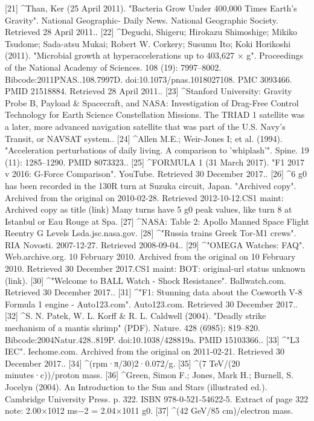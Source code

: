 [21]
^Than, Ker (25 April 2011). "Bacteria Grow Under 400,000 Times Earth's Gravity". National Geographic- Daily News. National Geographic Society. Retrieved 28 April 2011..
[22]
^Deguchi, Shigeru; Hirokazu Shimoshige; Mikiko Tsudome; Sada-atsu Mukai; Robert W. Corkery; Susumu Ito; Koki Horikoshi (2011). "Microbial growth at hyperaccelerations up to 403,627 × g". Proceedings of the National Academy of Sciences. 108 (19): 7997–8002. Bibcode:2011PNAS..108.7997D. doi:10.1073/pnas.1018027108. PMC 3093466. PMID 21518884. Retrieved 28 April 2011..
[23]
^Stanford University: Gravity Probe B, Payload & Spacecraft, and NASA: Investigation of Drag-Free Control Technology for Earth Science Constellation Missions. The TRIAD 1 satellite was a later, more advanced navigation satellite that was part of the U.S. Navy’s Transit, or NAVSAT system..
[24]
^Allen M.E.; Weir-Jones I; et al. (1994). "Acceleration perturbations of daily living. A comparison to 'whiplash'". Spine. 19 (11): 1285–1290. PMID 8073323..
[25]
^FORMULA 1 (31 March 2017). "F1 2017 v 2016: G-Force Comparison". YouTube. Retrieved 30 December 2017..
[26]
^6 g0 has been recorded in the 130R turn at Suzuka circuit, Japan. "Archived copy". Archived from the original on 2010-02-28. Retrieved 2012-10-12.CS1 maint: Archived copy as title (link) Many turns have 5 g0 peak values, like turn 8 at Istanbul or Eau Rouge at Spa.
[27]
^NASA: Table 2: Apollo Manned Space Flight Reentry G Levels Lsda.jsc.nasa.gov.
[28]
^"Russia trains Greek Tor-M1 crews". RIA Novosti. 2007-12-27. Retrieved 2008-09-04..
[29]
^"OMEGA Watches: FAQ". Web.archive.org. 10 February 2010. Archived from the original on 10 February 2010. Retrieved 30 December 2017.CS1 maint: BOT: original-url status unknown (link).
[30]
^"Welcome to BALL Watch - Shock Resistance". Ballwatch.com. Retrieved 30 December 2017..
[31]
^"F1: Stunning data about the Cosworth V-8 Formula 1 engine - Auto123.com". Auto123.com. Retrieved 30 December 2017..
[32]
^S. N. Patek, W. L. Korff & R. L. Caldwell (2004). "Deadly strike mechanism of a mantis shrimp" (PDF). Nature. 428 (6985): 819–820. Bibcode:2004Natur.428..819P. doi:10.1038/428819a. PMID 15103366..
[33]
^"L3 IEC". Iechome.com. Archived from the original on 2011-02-21. Retrieved 30 December 2017..
[34]
^(rpm·π/30)2·0.072/g.
[35]
^(7 TeV/(20 minutes·c))/proton mass.
[36]
^Green, Simon F.; Jones, Mark H.; Burnell, S. Jocelyn (2004). An Introduction to the Sun and Stars (illustrated ed.). Cambridge University Press. p. 322. ISBN 978-0-521-54622-5. Extract of page 322 note: 2.00×1012 ms−2 = 2.04×1011 g0.
[37]
^(42 GeV/85 cm)/electron mass.